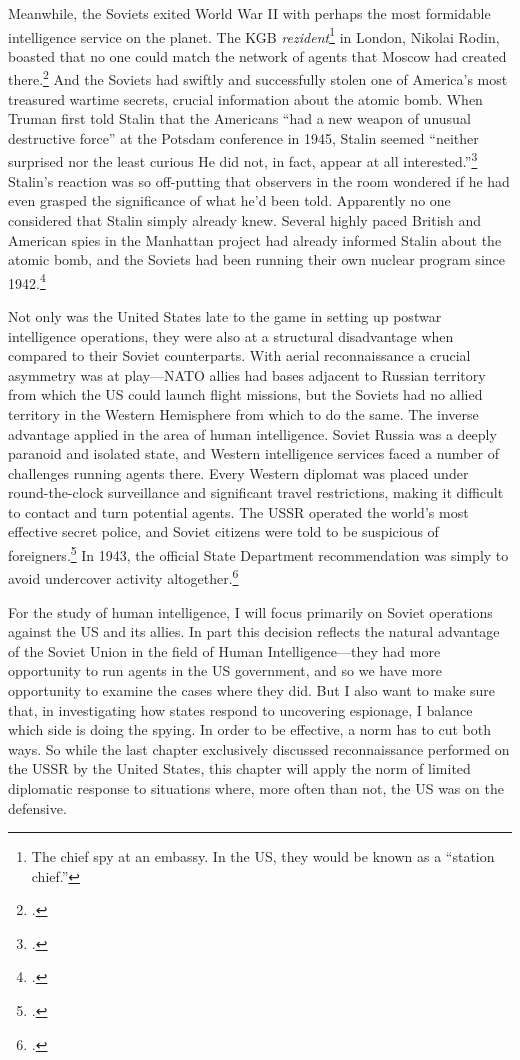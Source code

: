 \documentclass{memoir}
\begin{document}
\begin{refsegment}
Meanwhile, the Soviets exited World War II with perhaps the most formidable intelligence service on the planet. The KGB \emph{rezident}\footnote{The chief spy at an embassy. In the US, they would be known as a ``station chief.''} in London, Nikolai Rodin, boasted that no one could match the network of agents that Moscow had created there.\footcite[p.~151]{haslam_near_2015} And the Soviets had swiftly and successfully stolen one of America's most treasured wartime secrets, crucial information about the atomic bomb. When Truman first told Stalin that the Americans ``had a new weapon of unusual destructive force'' at the Potsdam conference in 1945, Stalin seemed ``neither surprised nor the least curious \textelp{} He did not, in fact, appear at all interested.''\footcite[p.~443]{mccullough_truman_1992}  Stalin's reaction was so off-putting that observers in the room wondered if he had even grasped the significance of what he'd been told. Apparently no one considered that Stalin simply already knew. Several highly paced British and American spies in the Manhattan project had already informed Stalin about the atomic bomb, and the Soviets had been running their own nuclear program since 1942.\footcite[p.~443]{mccullough_truman_1992}

Not only was the United States late to the game in setting up postwar intelligence operations, they were also at a structural disadvantage when compared to their Soviet counterparts. With aerial reconnaissance a crucial asymmetry was at play---NATO allies had bases adjacent to Russian territory from which the US could launch flight missions, but the Soviets had no allied territory in the Western Hemisphere from which to do the same. The inverse advantage applied in the area of human intelligence. Soviet Russia was a deeply paranoid and isolated state, and Western intelligence services faced a number of challenges running agents there. Every Western diplomat was placed under round-the-clock surveillance and significant travel restrictions, making it difficult to contact and turn potential agents. The USSR operated the world's most effective secret police, and Soviet citizens were told to be suspicious of foreigners.\footcite[p.~42]{richelson_american_1987} In 1943, the official State Department recommendation was simply to avoid undercover activity altogether.\footcite[p.~44]{richelson_american_1987}

For the study of human intelligence, I will focus primarily on Soviet operations against the US and its allies. In part this decision reflects the natural advantage of the Soviet Union in the field of Human Intelligence---they had more opportunity to run agents in the US government, and so we have more opportunity to examine the cases where they did. But I also want to make sure that, in investigating how states respond to uncovering espionage, I balance which side is doing the spying. In order to be effective, a norm has to cut both ways. So while the last chapter exclusively discussed reconnaissance performed on the USSR by the United States, this chapter will apply the norm of limited diplomatic response to situations where, more often than not, the US was on the defensive.


\end{refsegment}
\end{document}
